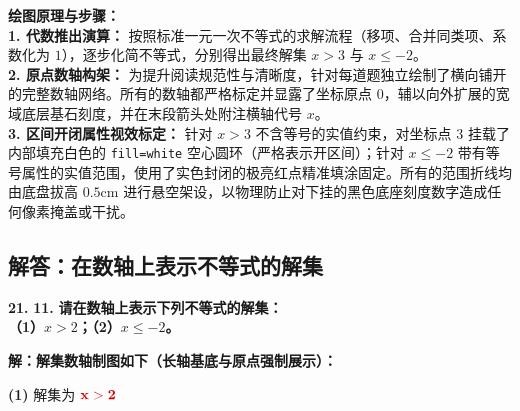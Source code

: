 \vspace{0.4cm}
{\small\color{blue!70!black}
\textbf{绘图原理与步骤：}\\
\textbf{1. 代数推出演算：} 按照标准一元一次不等式的求解流程（移项、合并同类项、系数化为 $1$），逐步化简不等式，分别得出最终解集 $x > 3$ 与 $x \leqslant -2$。\\
\textbf{2. 原点数轴构架：} 为提升阅读规范性与清晰度，针对每道题独立绘制了横向铺开的完整数轴网络。所有的数轴都严格标定并显露了坐标原点 $0$，辅以向外扩展的宽域底层基石刻度，并在末段箭头处附注横轴代号 $x$。\\
\textbf{3. 区间开闭属性视效标定：} 针对 $x > 3$ 不含等号的实值约束，对坐标点 $3$ 挂载了内部填充白色的 \texttt{fill=white} 空心圆环（严格表示开区间）；针对 $x \leqslant -2$ 带有等号属性的实值范围，使用了实色封闭的极亮红点精准填涂固定。所有的范围折线均由底盘拔高 $0.5\mathrm{cm}$ 进行悬空架设，以物理防止对下挂的黑色底座刻度数字造成任何像素掩盖或干扰。
}

\newpage

\newpage

\subsection{解答：在数轴上表示不等式的解集}

\vspace{0.6cm}

\textbf{\LARGE 21.} \textbf{\color{cyan!80!blue} 11. }\textbf{请在数轴上表示下列不等式的解集：\\
（1）$x > 2$；\hspace{4cm}（2）$x \leqslant -2$。}

\vspace{0.4cm}
\textbf{解：解集数轴制图如下（长轴基底与原点强制展示）：}

\vspace{0.4cm}
\noindent \textbf{(1)} 解集为 $\textcolor{red!80!black}{\mathbf{x > 2}}$ \par\vspace{0.2cm}
\begin{center}
\end{center}

